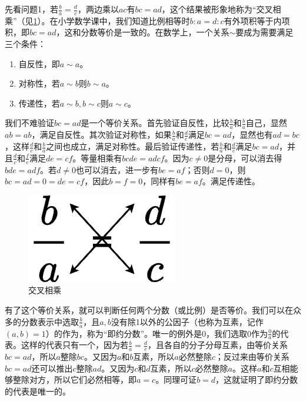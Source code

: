 \documentclass[b5paper]{ctexart}
\begin{document}
先看问题1，若$\frac{b}{a} = \frac{d}{c}$，两边乘以$ac$有$bc = ad$，这个结果被形象地称为“交叉相乘”（见\cref{fig:cross-mul}）。在小学数学课中，我们知道比例相等时$b : a = d : c$有外项积等于内项积，即$bc = ad$，这和分数等价是一致的。在数学上，一个关系$\sim$要成为需要满足三个条件：

\begin{enumerate}[条件1.]
\item 自反性，即$a \sim a$。
\item 对称性，若$a \sim b$则$b \sim a$。
\item 传递性，若$a \sim b, b \sim c$则$a \sim c$。
\end{enumerate}

我们不难验证$bc = ad$是一个等价关系。首先验证自反性，比较$\frac{b}{a}$和$\frac{b}{a}$自己，显然$ab = ab$，满足自反性。其次验证对称性，如果$\frac{b}{a}$和$\frac{d}{c}$满足$bc = ad$，显然也有$ad = bc$，这样$\frac{d}{c}$和$\frac{b}{a}$之间也成立，满足对称性。最后验证传递性，若$\frac{b}{a}$和$\frac{d}{c}$满足$bc = ad$，并且$\frac{d}{c}$和$\frac{f}{e}$满足$de = cf$。等量相乘有$bcde = adcf$。因为$c \ne 0$是分母，可以消去得$bde = adf$。若$d \ne 0$也可以消去，进一步有$be = af$；否则$d = 0$，则$bc = ad = 0 = de = cf$，因此$b = f = 0$，同样有$be = af$。满足传递性。

\begin{figure}[htbp]
 \centering
 \includegraphics[scale=0.4]{img/cross-mul}
 \caption{交叉相乘}
 \label{fig:cross-mul}
\end{figure}

有了这个等价关系，就可以判断任何两个分数（或比例）是否等价。我们可以在众多的分数表示中选取$\frac{b}{a}$，且$a, b$没有除1以外的公因子（也称为互素，记作$(a, b) = 1$）的作为，称为“即约分数”。唯一的例外是0，我们选取0作为$\frac{0}{a}$的代表。这样的代表只有一个，因为若$\frac{b}{a} = \frac{d}{c}$，且各自的分子分母互素，由等价关系$bc = ad$，所以$a$整除$bc$。又因为$a$和$b$互素，所以$a$必然整除$c$；反过来由等价关系$bc = ad$还可以推出$c$整除$ad$。又因为$c$和$d$互素，所以$c$必然整除$a$。这样$a$和$c$互相能够整除对方，所以它们必然相等，即$a = c$。同理可证$b = d$，这就证明了即约分数的代表是唯一的。
\end{document}
